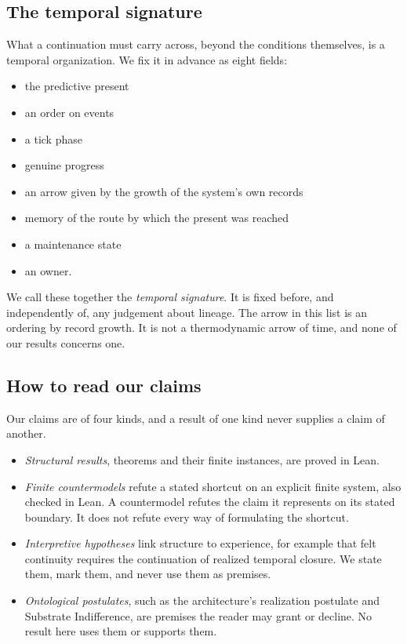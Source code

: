 

\subsection{The temporal signature}

What a continuation must carry across, beyond the conditions themselves, is a
temporal organization. We fix it in advance as eight fields:
\begin{itemize}
\item the predictive present
\item an order on events
\item a tick phase
\item genuine progress
\item an arrow given by the growth of the system's own records
\item memory of the route by which the present was reached
\item a maintenance state
\item an owner.
\end{itemize}
We call these together the \emph{temporal signature}. It is fixed before, and
independently of, any judgement about lineage. The arrow in this list is an
ordering by record growth. It is not a thermodynamic arrow of time, and none
of our results concerns one.

\subsection{How to read our claims}

Our claims are of four kinds, and a result of one kind never supplies a claim
of another.
\begin{itemize}
\item \emph{Structural results}, theorems and their finite instances, are
proved in Lean.
\item \emph{Finite countermodels} refute a stated shortcut on an explicit
finite system, also checked in Lean. A countermodel refutes the claim it
represents on its stated boundary. It does not refute every way of
formulating the shortcut.
\item \emph{Interpretive hypotheses} link structure to experience, for example
that felt continuity requires the continuation of realized temporal closure.
We state them, mark them, and never use them as premises.
\item \emph{Ontological postulates}, such as the architecture's realization
postulate and Substrate Indifference, are premises the reader may grant or
decline. No result here uses them or supports them.
\end{itemize}

